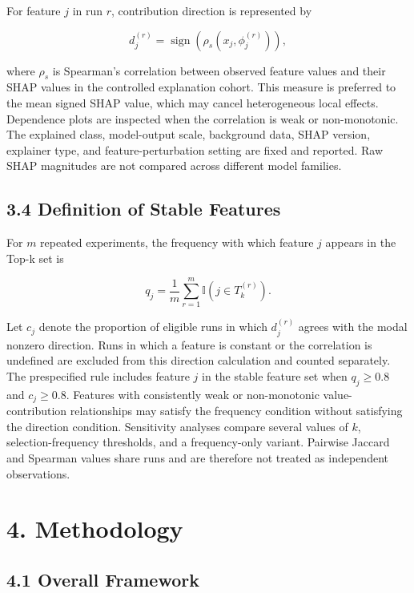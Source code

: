 \documentclass[
  10pt,
]{article}
\begin{document}
For feature \(j\) in run \(r\), contribution direction is represented by

\[
d_j^{(r)}=\operatorname{sign}\left(\rho_s(x_j,\phi_j^{(r)})\right),
\]

where \(\rho_s\) is Spearman's correlation between observed feature
values and their SHAP values in the controlled explanation cohort. This
measure is preferred to the mean signed SHAP value, which may cancel
heterogeneous local effects. Dependence plots are inspected when the
correlation is weak or non-monotonic. The explained class, model-output
scale, background data, SHAP version, explainer type, and
feature-perturbation setting are fixed and reported. Raw SHAP magnitudes
are not compared across different model families.

\subsection{3.4 Definition of Stable
Features}\label{definition-of-stable-features}

For \(m\) repeated experiments, the frequency with which feature \(j\)
appears in the Top-k set is

\[
q_j=\frac{1}{m}\sum_{r=1}^{m}\mathbb{I}(j\in T_k^{(r)}).
\]

Let \(c_j\) denote the proportion of eligible runs in which
\(d_j^{(r)}\) agrees with the modal nonzero direction. Runs in which a
feature is constant or the correlation is undefined are excluded from
this direction calculation and counted separately. The prespecified rule
includes feature \(j\) in the stable feature set when \(q_j\geq0.8\) and
\(c_j\geq0.8\). Features with consistently weak or non-monotonic
value-contribution relationships may satisfy the frequency condition
without satisfying the direction condition. Sensitivity analyses compare
several values of \(k\), selection-frequency thresholds, and a
frequency-only variant. Pairwise Jaccard and Spearman values share runs
and are therefore not treated as independent observations.

\section{4. Methodology}\label{methodology}

\subsection{4.1 Overall Framework}\label{overall-framework}
\end{document}
